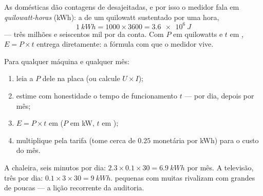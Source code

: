 \begin{definition}\label{def:g9:electric-power-energy:kwh}
As  domésticas dão contagens de  desajeitadas, e por
isso o medidor fala em \emph{quilowatt-horas}
(\unit{kWh}): a  de um quilowatt sustentado por uma hora,
\[
\qty{1}{kWh} = 1000 \times 3600 = \qty{3.6e6}{J}
\]
--- três milhões e seiscentos mil  por  da conta. Com $P$
em quilowatts e $t$ em , $E = P \times t$ entrega
 diretamente: a fórmula com que o medidor vive.
\end{definition}

\begin{method}\label{met:g9:electric-power-energy:audit}
Para qualquer máquina e qualquer mês:
\begin{enumerate}
  \item leia a  $P$ dele na placa (ou calcule $U \times I$);
  \item estime com honestidade o tempo de funcionamento $t$ --- por
        dia, depois por mês;
  \item $E = P \times t$ em  ($P$ em \unit{kW}, $t$ em
        );
  \item multiplique pela tarifa (tome cerca de $0.25$ 
        monetária por \unit{kWh}) para o custo do mês.
\end{enumerate}
A chaleira, seis minutos por dia:
$2.3 \times 0.1 \times 30 = \qty{6.9}{kWh}$ por mês. A televisão,
três  por dia: $0.1 \times 3 \times 30 = \qty{9}{kWh}$.
 pequenas com muitas  rivalizam com  grandes
de poucas  --- a lição recorrente da auditoria.
\end{method}

